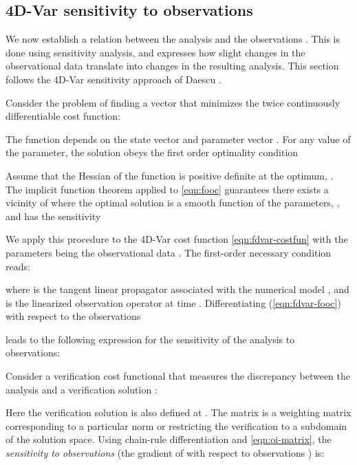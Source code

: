 \documentclass[final,sort&compress]{elsarticle}
\begin{document}
\subsection{4D-Var sensitivity to observations}\label{sec:sensan}


We now establish a  relation between the analysis  and the observations .
This is done using sensitivity analysis, and expresses how slight changes
in the observational data translate into changes in the resulting analysis.
This section follows the 4D-Var sensitivity approach of Daescu \cite{Daescu_2008}.

Consider the problem of finding a vector  
that minimizes the twice continuously differentiable cost function:

The function depends on the state vector  and parameter vector . 
For any value  of the parameter, the solution
obeys the first order optimality condition


Assume that the Hessian of the function is positive definite at the optimum, .
The implicit function theorem applied to \eqref{eqn:fooc} guarantees there exists a vicinity of  where the optimal solution is a smooth function
of the parameters, , and has the sensitivity

We apply this procedure to the 4D-Var cost function \eqref{eqn:fdvar-costfun} with the parameters  being the observational data . The first-order necessary condition reads:

where  is the tangent linear propagator associated with the 
numerical model , and  is the linearized observation operator at time . 
Differentiating (\ref{eqn:fdvar-fooc}) with respect to the observations  

leads to the following expression for the sensitivity of the analysis to observations:



Consider a verification cost functional 
that measures the discrepancy between the analysis and a verification solution :

Here the verification solution  is also defined at . The matrix  is a weighting matrix corresponding to a particular norm
or restricting the verification to a subdomain of the solution space. 
Using chain-rule differentiation and \eqref{eqn:oi-matrix}, 
the \emph{sensitivity to observations} (the gradient of  with respect to observations ) is:
\end{document}
